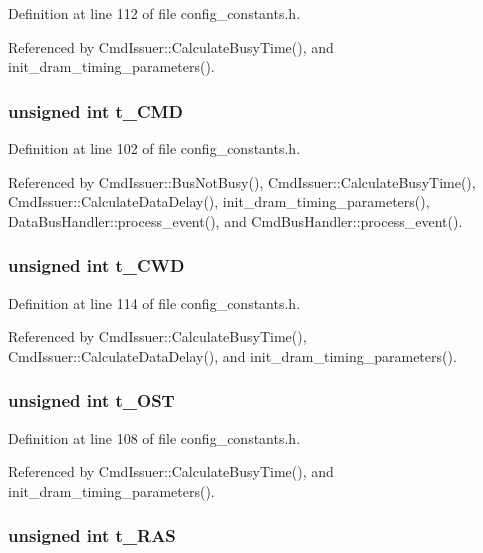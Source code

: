 Definition at line 112 of file config\_\-constants.h.

Referenced by CmdIssuer::CalculateBusyTime(), and init\_\-dram\_\-timing\_\-parameters().
\subsubsection[{t\_\-CMD}]{\setlength{\rightskip}{0pt plus 5cm}unsigned int {\bf t\_\-CMD}}\label{mc__constants_8h_5e6fb6985dd38cc49b5ce59ae03c38f5}




Definition at line 102 of file config\_\-constants.h.

Referenced by CmdIssuer::BusNotBusy(), CmdIssuer::CalculateBusyTime(), CmdIssuer::CalculateDataDelay(), init\_\-dram\_\-timing\_\-parameters(), DataBusHandler::process\_\-event(), and CmdBusHandler::process\_\-event().
\subsubsection[{t\_\-CWD}]{\setlength{\rightskip}{0pt plus 5cm}unsigned int {\bf t\_\-CWD}}\label{mc__constants_8h_8d2c5042227878717374eaf8143c83df}




Definition at line 114 of file config\_\-constants.h.

Referenced by CmdIssuer::CalculateBusyTime(), CmdIssuer::CalculateDataDelay(), and init\_\-dram\_\-timing\_\-parameters().
\subsubsection[{t\_\-OST}]{\setlength{\rightskip}{0pt plus 5cm}unsigned int {\bf t\_\-OST}}\label{mc__constants_8h_33458185043efd953a4ba2e0b7a53538}




Definition at line 108 of file config\_\-constants.h.

Referenced by CmdIssuer::CalculateBusyTime(), and init\_\-dram\_\-timing\_\-parameters().
\subsubsection[{t\_\-RAS}]{\setlength{\rightskip}{0pt plus 5cm}unsigned int {\bf t\_\-RAS}}\label{mc__constants_8h_889f565a9460cfb8a604b60d52f17d09}




